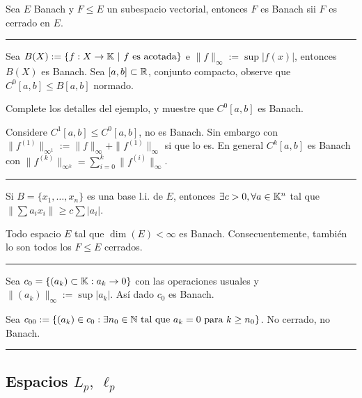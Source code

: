 \E  

\begin{proposition}
    Sea \(E\) Banach y \(F\leq E\) un subespacio vectorial, entonces \(F\) es Banach sii \(F\) es cerrado en \(E\). 
\end{proposition}

\E 

\hrule 
\begin{example}
    Sea \(B(X):= \{f:X\rightarrow \K \ |\ f \ \text{es acotada}\}\) e \(\|f\|_\infty := \sup |f(x)|\), entonces \(B(X)\) es Banach. Sea \([a,b]\subset \mathbb{R}\), conjunto compacto, observe que \(C^0[a,b]\leq B[a,b]\) normado.   
\end{example}
\begin{exercise}
    Complete los detalles del ejemplo, y muestre que \(C^0[a,b]\) es Banach.
\end{exercise}
\begin{example}
    Considere \(C^1[a,b] \leq C^0[a,b]\), no es Banach. Sin embargo con \(\|f^{(1)}\|_{\infty^1}:= \|f\|_\infty + \|f^{(1)}\|_\infty\) si que lo es. En general \(C^k[a,b]\) es Banach con \(\|f^{(k)}\|_{\infty^k} = \sum_{i=0}^k \|f^{(i)}\|_\infty\). 
\end{example}
\hrule 

\E

\begin{proposition}
    Si \(B = \{x_1,\ldots,x_n\}\) es una base l.i. de \(E\), entonces \(\exists c>0, \forall a \in \mathbb{K}^n\) tal que \(\left\|\sum a_ix_i\right\|\geq c \sum |a_i|\). 
\end{proposition}
\begin{theorem}
    Todo espacio \(E\) tal que \(\dim{(E)}<\infty\) es Banach. Consecuentemente, también lo son todos los \(F\leq E\) cerrados. 
\end{theorem}

\E

\hrule
\begin{example}
    Sea \(c_0=\{(a_k) \subset \mathbb{K} : a_k \rightarrow 0\}\) con las operaciones usuales y \(\|(a_k)\|_\infty := \sup |a_k|\). Así dado \(c_0\) es Banach. 
\end{example}
\begin{example}
    Sea \(c_{00}:= \{(a_k)\in c_0 : \exists n_0\in \mathbb{N} \text{ tal que } a_k = 0\text{ para } k\geq n_0\}\). No cerrado, no Banach. 
\end{example}
\hrule 

\subsection*{Espacios \(L_p,\ \ell_p\)}

